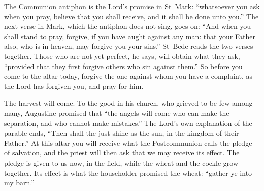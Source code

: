 The Communion antiphon is the Lord's promise in St~Mark: ``whatsoever you ask
when you pray, believe that you shall receive, and it shall be done unto
you.'' The next verse in Mark, which the antiphon does not sing, goes on:
``And when you shall stand to pray, forgive, if you have aught against any
man: that your Father also, who is in heaven, may forgive you your sins.''
St~Bede reads the two verses together. Those who are not yet perfect, he says,
will obtain what they ask, ``provided that they first forgive others who sin
against them.'' So before you come to the altar today, forgive the one
against whom you have a complaint, as the Lord has forgiven you, and pray for
him.

The harvest will come. To the good in his church, who grieved to be few among
many, Augustine promised that ``the angels will come who can make the
separation, and who cannot make mistakes.'' The Lord's own explanation of
the parable ends, ``Then shall the just shine as the sun, in the kingdom of
their Father.'' At this altar you will
receive what the Postcommunion calls the pledge of salvation, and the priest
will then ask that we may receive its effect. The pledge is given to us now,
in the field, while the wheat and the cockle grow together. Its effect is
what the householder promised the wheat: ``gather ye into my barn.''
